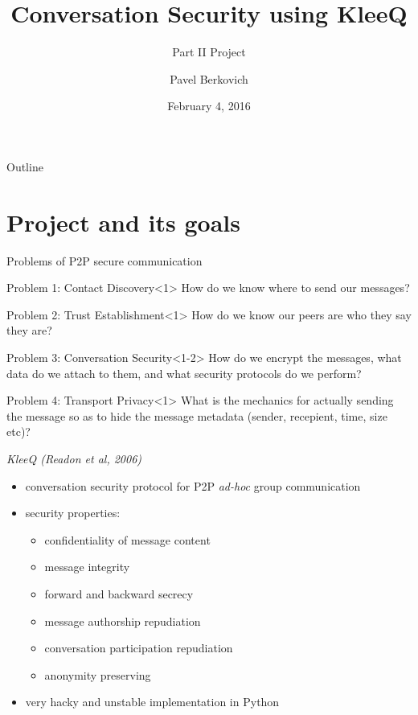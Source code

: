 \documentclass{beamer}
\title{Conversation Security using KleeQ}
\subtitle{Part II Project}
\author{Pavel Berkovich}
\institute[University of Cambridge] %
{
  \inst{}%
  University of Cambridge \\ 
  \vspace{1cm}
  \inst{}%
  \Small{Supervised by Dr.~Richard Clayton}
}
\date{February 4, 2016}
\begin{document}
\begin{frame}
  \titlepage
\end{frame}

\begin{frame}{Outline}
  \tableofcontents
\end{frame}

\section{Project and its goals}
\begin{frame}{Problems of P2P secure communication}
    \begin{block}{Problem 1: Contact Discovery}<1>
        How do we know where to send our messages?
    \end{block}
    \begin{block}{Problem 2: Trust Establishment}<1>
        How do we know our peers are who they say they are?
    \end{block}
    \begin{block}{Problem 3: Conversation Security}<1-2>
        How do we encrypt the messages, what data do we attach to them, and what security protocols do we perform?
    \end{block}
    \begin{block}{Problem 4: Transport Privacy}<1>
        What is the mechanics for actually sending the message so as to hide the message metadata (sender, recepient, time, size etc)?
    \end{block}
\end{frame}

\begin{frame}{\textit{KleeQ (Readon et al, 2006)}}
    \begin{itemize}
        \item conversation security protocol for P2P \textit{ad-hoc} group communication
        \item security properties:
            \begin{itemize}
                \item confidentiality of message content
                \item message integrity
                \item forward and backward secrecy
                \item message authorship repudiation
                \item conversation participation repudiation
                \item anonymity preserving
            \end{itemize}
        \item very hacky and unstable implementation in Python
    \end{itemize}
\end{frame}
\end{document}
